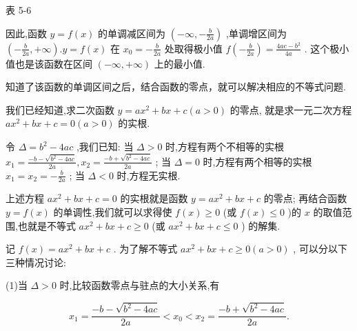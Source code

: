 \documentclass[10pt]{article}
\begin{document}
表 5-6

\begin{center}
\end{center}

因此,函数 \(y = f\left( x\right)\) 的单调减区间为 \(\left( {-\infty , - \frac{b}{2a}}\right)\) ,单调增区间为 \(\left( {-\frac{b}{2a}, + \infty }\right) .y = f\left( x\right)\) 在 \({x}_{0} =  - \frac{b}{2a}\) 处取得极小值 \(f\left( {-\frac{b}{2a}}\right)  = \frac{{4ac} - {b}^{2}}{4a}\) . 这个极小值也是该函数在区间 \(\left( {-\infty , + \infty }\right)\) 上的最小值.

知道了该函数的单调区间之后，结合函数的零点，就可以解决相应的不等式问题.

我们已经知道,求二次函数 \(y = a{x}^{2} + {bx} + c\left( {a > 0}\right)\) 的零点, 就是求一元二次方程 \(a{x}^{2} + {bx} + c = 0\left( {a > 0}\right)\) 的实根.

令 \(\Delta  = {b}^{2} - {4ac}\) ,我们已知: 当 \(\Delta  > 0\) 时,方程有两个不相等的实根 \({x}_{1} = \frac{-b - \sqrt{{b}^{2} - {4ac}}}{2a},{x}_{2} = \frac{-b + \sqrt{{b}^{2} - {4ac}}}{2a}\) ; 当 \(\Delta  = 0\) 时,方程有两个相等的实根 \({x}_{1} = {x}_{2} =  - \frac{b}{2a}\) ; 当 \(\Delta  < 0\) 时,方程无实根.

上述方程 \(a{x}^{2} + {bx} + c = 0\) 的实根就是函数 \(y = a{x}^{2} + {bx} + c\) 的零点; 再结合函数 \(y = f\left( x\right)\) 的单调性,我们就可以求得使 \(f\left( x\right)  \geq  0\) (或 \(f\left( x\right)  \leq  0\) )的 \(x\) 的取值范围,也就是不等式 \(a{x}^{2} + {bx} + c \geq  0\) (或 \(a{x}^{2} + {bx} + c \leq  0\) ) 的解集.

记 \(f\left( x\right)  = a{x}^{2} + {bx} + c\) . 为了解不等式 \(a{x}^{2} + {bx} + c \geq  0\left( {a > 0}\right)\) , 可以分以下三种情况讨论:

(1)当 \(\Delta  > 0\) 时,比较函数零点与驻点的大小关系,有

\[
{x}_{1} = \frac{-b - \sqrt{{b}^{2} - {4ac}}}{2a} < {x}_{0} < {x}_{2} = \frac{-b + \sqrt{{b}^{2} - {4ac}}}{2a}.
\]
\end{document}
